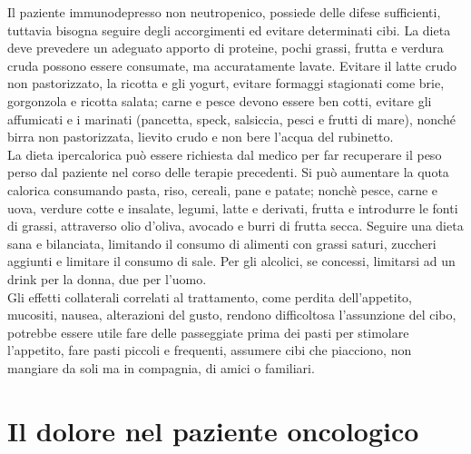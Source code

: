 Il paziente immunodepresso non neutropenico, possiede delle difese sufficienti, tuttavia bisogna seguire degli 
accorgimenti ed evitare determinati cibi. La dieta deve prevedere 
un adeguato apporto di proteine, pochi grassi, frutta e verdura cruda possono essere consumate, ma accuratamente 
lavate. Evitare il latte crudo non pastorizzato, la ricotta e gli yogurt, evitare formaggi stagionati come 
brie, gorgonzola e ricotta salata; carne e pesce devono essere ben cotti, evitare gli affumicati e i 
marinati (pancetta, speck, salsiccia, pesci e frutti di mare), nonché birra non pastorizzata, lievito crudo e
non bere l’acqua del rubinetto\cite{DIETA}.\\
La dieta ipercalorica può essere richiesta dal medico per far recuperare il peso perso dal paziente nel corso delle 
terapie precedenti. Si può aumentare la quota calorica consumando pasta, riso, cereali, pane e patate; 
nonchè pesce, carne e uova, verdure cotte e insalate, legumi, latte e derivati, frutta e introdurre le fonti di grassi, 
attraverso olio d’oliva, avocado e burri di frutta secca\cite{DIETA}. 
Seguire una dieta sana e bilanciata, limitando il consumo di alimenti con grassi 
saturi, zuccheri aggiunti e limitare il consumo di sale. Per gli alcolici, se concessi, 
limitarsi ad un drink per la donna, due per l’uomo\cite{LLSNUTRITION}.\\
Gli effetti collaterali correlati al trattamento, come perdita dell’appetito, mucositi, nausea, alterazioni del 
gusto, rendono difficoltosa l’assunzione del cibo, potrebbe essere utile fare delle passeggiate prima dei pasti per 
stimolare l’appetito, fare pasti piccoli e frequenti, assumere cibi che piacciono, non mangiare da soli ma in compagnia, di 
amici o familiari\cite{LLSNUTRITION}.

\section{Il dolore nel paziente oncologico}

